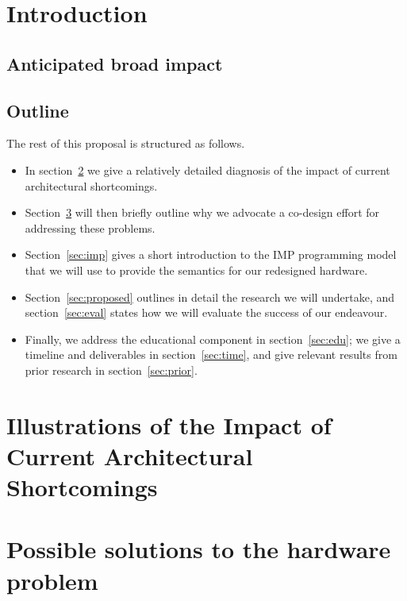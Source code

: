 
\section{Introduction}


\subsection{Anticipated broad impact}


\subsection{Outline}
The rest of this proposal is structured as follows.
\begin{itemize}
\item In section~\ref{sec:diagnosis} we give a relatively detailed
  diagnosis of the impact of current architectural shortcomings.
\item Section~\ref{sec:sketch} will then briefly outline why we
  advocate a co-design effort for addressing these problems.
\item Section~\ref{sec:imp} gives a short introduction to the IMP
  programming model that we will use to provide the semantics for
  our redesigned hardware.
\item Section~\ref{sec:proposed} outlines in detail the research we
  will undertake, and section~\ref{sec:eval} states how we will
  evaluate the success of our endeavour.
\item Finally, we address the educational component in
  section~\ref{sec:edu}; we give a timeline and deliverables in
  section~\ref{sec:time}, and give relevant results from prior
  research in section~\ref{sec:prior}.
\end{itemize}

\section{Illustrations of the Impact of Current Architectural Shortcomings}
\label{sec:diagnosis}



\section{Possible solutions to the hardware problem}
\label{sec:sketch}


